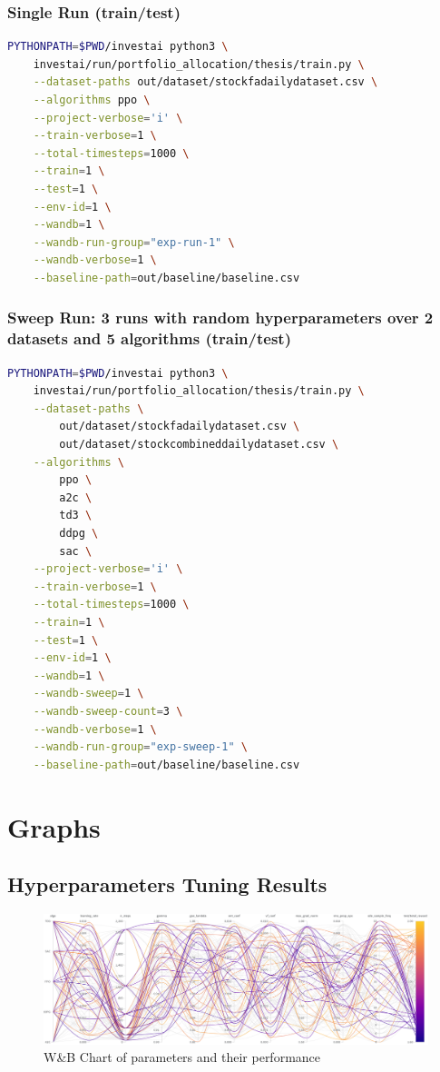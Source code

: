 \documentclass[../xlapes02]{subfiles}
\begin{document}
    \subsection{Single Run (train/test)}\label{subsec:single-run-(train/test)}
    \begin{lstlisting}[language=bash,label={lst:run-train}]
PYTHONPATH=$PWD/investai python3 \
    investai/run/portfolio_allocation/thesis/train.py \
    --dataset-paths out/dataset/stockfadailydataset.csv \
    --algorithms ppo \
    --project-verbose='i' \
    --train-verbose=1 \
    --total-timesteps=1000 \
    --train=1 \
    --test=1 \
    --env-id=1 \
    --wandb=1 \
    --wandb-run-group="exp-run-1" \
    --wandb-verbose=1 \
    --baseline-path=out/baseline/baseline.csv
    \end{lstlisting}

    \subsection{Sweep Run: 3 runs with random hyperparameters over 2 datasets and 5 algorithms (train/test)}\label{subsec:sweep-run:-3-runs-with-random-hyperparameters-over-2-datasets-and-5-algorithms-(train/test)}
    \begin{lstlisting}[language=bash,label={lst:sweep-train}]
PYTHONPATH=$PWD/investai python3 \
    investai/run/portfolio_allocation/thesis/train.py \
    --dataset-paths \
        out/dataset/stockfadailydataset.csv \
        out/dataset/stockcombineddailydataset.csv \
    --algorithms \
        ppo \
        a2c \
        td3 \
        ddpg \
        sac \
    --project-verbose='i' \
    --train-verbose=1 \
    --total-timesteps=1000 \
    --train=1 \
    --test=1 \
    --env-id=1 \
    --wandb=1 \
    --wandb-sweep=1 \
    --wandb-sweep-count=3 \
    --wandb-verbose=1 \
    --wandb-run-group="exp-sweep-1" \
    --baseline-path=out/baseline/baseline.csv
    \end{lstlisting}


    \chapter{Graphs}\label{ch:graphs}


    \section{Hyperparameters Tuning Results}\label{sec:hyperparameters-tuning-results}
    \begin{figure}[H]
        \centering
        \includegraphics[width=\linewidth]{image/wandb/wb1}
        \caption{W\&B Chart of parameters and their performance}
        \label{fig:wb-chart1}
    \end{figure}
\end{document}
